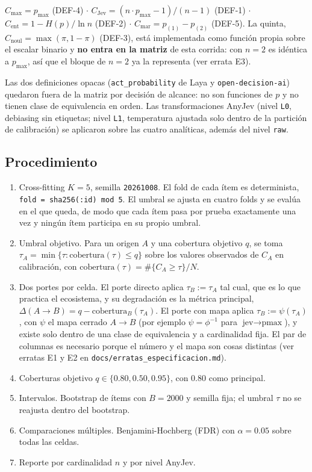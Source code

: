 $C_{\max} = p_{\max}$ (DEF-4) $\cdot$ $C_{\text{Jev}} = (n\cdot p_{\max} - 1)/(n - 1)$ (DEF-1) $\cdot$
$C_{\text{ent}} = 1 - H(p)/\ln n$ (DEF-2) $\cdot$ $C_{\text{mar}} = p_{(1)} - p_{(2)}$ (DEF-5). La quinta,
$C_{\text{noul}} = \max(\pi, 1-\pi)$ (DEF-3), está implementada como función propia sobre el escalar binario y
\textbf{no entra en la matriz} de esta corrida: con $n = 2$ es idéntica a $p_{\max}$, así que el bloque de
$n = 2$ ya la representa (ver errata E3).

Las dos definiciones opacas (\texttt{act\_probability} de Laya y \texttt{open-decision-ai})
quedaron fuera de la matriz por decisión de alcance: no son funciones de $p$ y no tienen clase de
equivalencia en orden. Las transformaciones AnyJev (nivel \texttt{L0}, debiasing sin etiquetas; nivel
\texttt{L1}, temperatura ajustada solo dentro de la partición de calibración) se aplicaron sobre las cuatro
analíticas, además del nivel \texttt{raw}.

\subsection{Procedimiento}

\begin{enumerate}
\item Cross-fitting $K = 5$, semilla \texttt{20261008}. El fold de cada ítem es determinista,
   \texttt{fold = sha256(:id\textquotedbl) mod 5}. El umbral se ajusta en cuatro folds y se evalúa en el que
   queda, de modo que cada ítem pasa por prueba exactamente una vez y ningún ítem participa en su propio
   umbral.
\item Umbral objetivo. Para un origen $A$ y una cobertura objetivo $q$, se toma
   $\tau_A = \min\{\tau : \text{cobertura}(\tau) \le q\}$ sobre los valores observados de $C_A$ en
   calibración, con $\text{cobertura}(\tau) = \#\{C_A \ge \tau\}/N$.
\item Dos portes por celda. El porte directo aplica $\tau_B := \tau_A$ tal cual, que es lo
   que practica el ecosistema, y su degradación es la métrica principal,
   $\Delta(A \to B) = q - \text{cobertura}_B(\tau_A)$. El porte con mapa aplica
   $\tau_B := \psi(\tau_A)$, con $\psi$ el mapa cerrado $A \to B$ (por ejemplo $\psi = \phi^{-1}$ para
   $\text{jev} \to \text{pmax}$), y existe solo dentro de una clase de equivalencia y a cardinalidad fija. El
   par de columnas es necesario porque el número y el mapa son cosas distintas (ver erratas E1 y E2 en
   \texttt{docs/erratas\_especificacion.md}).
\item Coberturas objetivo $q \in \{0.80, 0.50, 0.95\}$, con 0.80 como principal.
\item Intervalos. Bootstrap de ítems con $B = 2000$ y semilla fija; el umbral $\tau$ no se reajusta
   dentro del bootstrap.
\item Comparaciones múltiples. Benjamini-Hochberg (FDR) con $\alpha = 0.05$ sobre todas las celdas.
\item Reporte por cardinalidad $n$ y por nivel AnyJev.
\end{enumerate}

